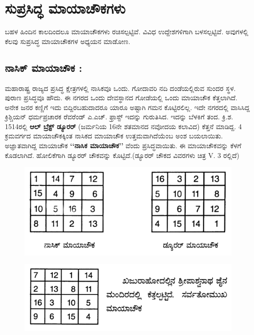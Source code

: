\chapter{ಸುಪ್ರಸಿದ್ಧ ಮಾಯಾಚೌಕಗಳು}

ಬಹಳ ಹಿಂದಿನ ಕಾಲದಿಂದಲೂ ಮಾಯಾಚೌಕಗಳು ರಚಿಸಲ್ಪಟ್ಟಿವೆ. ವಿವಿಧ ಉದ್ದೇಶಗಳಿಗಾಗಿ ಬಳಸಲ್ಪಟ್ಟಿವೆ. ಅವುಗಳಲ್ಲಿ ಕೆಲವು ಸುಪ್ರಸಿದ್ಧ ಮಾಯಾಚೌಕಗಳ ಅಧ್ಯಯನ ಮಾಡೋಣ.

\section*{ನಾಸಿಕ್ ಮಾಯಾಚೌಕ :}

ಮಹಾರಾಷ್ಟ್ರ ರಾಜ್ಯದ ಪ್ರಸಿದ್ಧ ಕ್ಷೇತ್ರಗಳಲ್ಲಿ ನಾಸಿಕವೂ ಒಂದು. ಗೋದಾವರಿ ನದಿ ದಂಡೆಯಲ್ಲಿರುವ ಸುಂದರ ಸ್ಥಳ. ಪುರಾಣ ಪ್ರಸಿದ್ಧವೂ ಹೌದು. ಈ ನಗರದ ಒಂದು ದೇವಸ್ಥಾನದ ಗೋಡೆಯಲ್ಲಿ ಒಂದು ಮಾಯಾಚೌಕ ಕೆತ್ತಲಾಗಿದೆ. ಅನೇಕ ಜನರ ಕಣ್ಣಿಗೆ ಇದು ಬಿದ್ದಿರಬಹುದಾದರೂ ಯಾರೂ ಅಷ್ಟಾಗಿ ಗಮನ ಕೊಟ್ಟಿರಲಿಲ್ಲ. ಇದೇ ನಗರದಲ್ಲಿ ವಾಸಿಸಿದ್ದ ಕ್ರಿಶ್ಚಿಯನ್ ಧರ್ಮಪ್ರಚಾರಕ ರೆವರೆಂಡ್ ಎ.ಎಚ್. ಫ್ರಾಸ್ಟ್ ಇದನ್ನು ಗುರುತಿಸಿದ. ಇದನ್ನು ಬೆಳಕಿಗೆ ತಂದ. ಕ್ರಿ.ಶ. 1514ರಲ್ಲಿ \textbf{ಆಲ್ ಬ್ರೆಕ್ಟ್ ಡ್ಯೂರರ್} (ಜರ್ಮನಿಯ 16ನೇ ಶತಮಾನದ ನವೋದಯ ಕಲಾವಿದ) ಕೆತ್ತನೆ ಮಾಡಿದ್ದ. 4 ಕ್ರಮವರ್ಗದ ಮಾಯಾಚೌಕಕ್ಕಿಂತ ನಾಸಿಕದ ಮಾಯಾಚೌಕ ಉತ್ತಮವಾಗಿದೆಯೆಂಬ ಅಂಶ ಬಯಲಾಯಿತು. ಅಜ್ಞಾತವಾಗಿದ್ದ ಮಾಯಾಚೌಕ \textbf{‘‘ನಾಸಿಕ ಮಾಯಾಚೌಕ’’} ವೆಂದು ಪ್ರಸಿದ್ಧವಾಯಿತು. ಈ ಮಾಯಾಚೌಕವನ್ನು ಕೆಳಗೆ ಕೊಡಲಾಗಿದೆ. ಹೋಲಿಕೆಗಾಗಿ ಡ್ಯೂರರ್ ಚೌಕವನ್ನು ಕೊಟ್ಟಿದೆ.(ಡ್ಯೂರರ್ ಚೌಕದ ವಿವರಗಳು ಚಿತ್ರ V. 3 ರಲ್ಲಿದೆ)
\begin{figure}[H]
\includegraphics{src/figures/chap4/fig4-1.jpg}
\end{figure}
\begin{figure}[H]
\includegraphics[scale=.9]{src/figures/chap4/fig4-2.jpg}
\end{figure}


